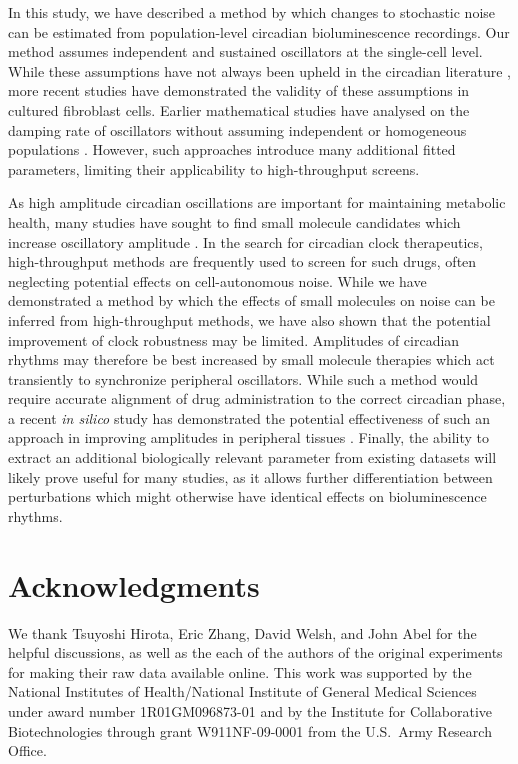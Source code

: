 \documentclass[11pt, letterpaper]{article}
\begin{document}
In this study, we have described a method by which changes to stochastic noise can be estimated from population-level circadian bioluminescence recordings.
Our method assumes independent and sustained oscillators at the single-cell level.
While these assumptions have not always been upheld in the circadian literature \cite{Izumo2003}, more recent studies have demonstrated the validity of these assumptions in cultured fibroblast cells.
Earlier mathematical studies have analysed on the damping rate of oscillators without assuming independent or homogeneous populations \cite{Rougemont2007}.
However, such approaches introduce many additional fitted parameters, limiting their applicability to high-throughput screens.

As high amplitude circadian oscillations are important for maintaining metabolic health, many studies have sought to find small molecule candidates which increase oscillatory amplitude \cite{Chen2013}.
In the search for circadian clock therapeutics, high-throughput methods are frequently used to screen for such drugs, often neglecting potential effects on cell-autonomous noise.
While we have demonstrated a method by which the effects of small molecules on noise can be inferred from high-throughput methods, we have also shown that the potential improvement of clock robustness may be limited.
Amplitudes of circadian rhythms may therefore be best increased by small molecule therapies which act transiently to synchronize peripheral oscillators.
While such a method would require accurate alignment of drug administration to the correct circadian phase, a recent {\itshape in silico} study has demonstrated the potential effectiveness of such an approach in improving amplitudes in peripheral tissues \cite{St.John2014a}.
Finally, the ability to extract an additional biologically relevant parameter from existing datasets will likely prove useful for many studies, as it allows further differentiation between perturbations which might otherwise have identical effects on bioluminescence rhythms.



\section*{Acknowledgments}
We thank Tsuyoshi Hirota, Eric Zhang, David Welsh, and John Abel for the helpful discussions, as well as the each of the authors of the original experiments for making their raw data available online.
This work was supported by the National Institutes of Health/National Institute of General Medical Sciences under award number 1R01GM096873-01 and by the Institute for Collaborative Biotechnologies through grant W911NF-09-0001 from the U.S.\ Army Research Office.
\end{document}

